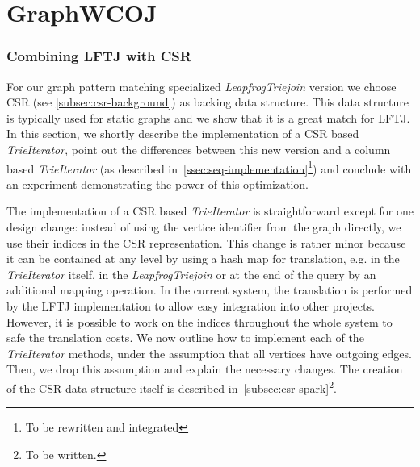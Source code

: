 \section{Graph\textsc{WCOJ}} \label{sec:graphwcoj}

\subsubsection{Combining \textsc{LFTJ} with \textsc{CSR}}
For our graph pattern matching specialized \textit{LeapfrogTriejoin} version we choose \textsc{CSR} (see \cref{subsec:csr-background}) as
backing data structure.
This data structure is typically used for static graphs and we show that it is a great match for \textsc{LFTJ}.
In this section, we shortly describe the implementation of a \textsc{CSR} based \textit{TrieIterator}, point out the differences between
this new version and a column based \textit{TrieIterator} (as described in~\cref{ssec:seq-implementation}\footnote{To be rewritten and
integrated}) and conclude with an experiment demonstrating the power of this optimization.

The implementation of a \textsc{CSR} based \textit{TrieIterator} is straightforward except for one design change: instead of using
the vertice identifier from the graph directly, we use their indices in the \textsc{CSR} representation.
This change is rather minor because it can be contained at any level by using a hash map for translation, e.g. in the
\textit{TrieIterator} itself, in the \textit{LeapfrogTriejoin} or at the end of the query by an additional mapping operation.
In the current system, the translation is performed by the \textsc{LFTJ} implementation to allow easy integration into other projects.
However, it is possible to work on the indices throughout the whole system to safe the translation costs.
We now outline how to implement each of the \textit{TrieIterator} methods, under the assumption that all vertices have outgoing edges.
Then, we drop this assumption and explain the necessary changes.
The creation of the \textsc{CSR} data structure itself is described in~\cref{subsec:csr-spark}\footnote{To be
written.}.

